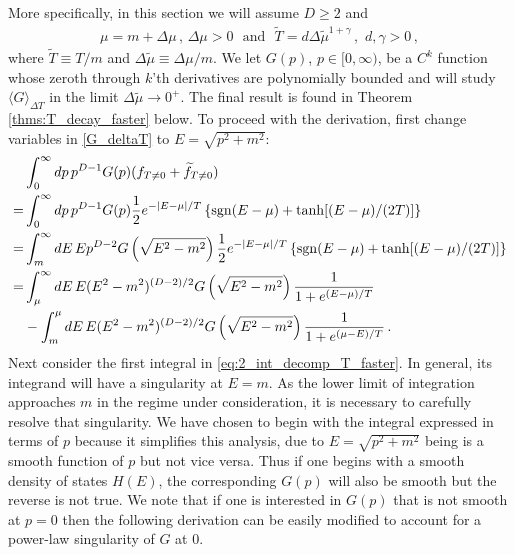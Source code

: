 \documentclass[sn-mathphys,Numbered]{sn-jnl}
\begin{document}
More specifically, in this section we will assume  $D\geq 2$ and
\begin{align}\label{eq:T_mu_relation}
    \mu=m+\Delta\mu\,, \,\Delta\mu>0 \,\, \text{ and } \,\, \widetilde{T}=d\Delta\widetilde{\mu}^{1+\gamma}\,, \,\,d,\gamma>0\,,
\end{align}
where $\widetilde{T}\equiv T/m$ and $\Delta\widetilde{\mu}\equiv \Delta\mu/m$. We let $G(p)$, $p\in[0,\infty)$, be a $C^k$ function whose zeroth through $k$'th derivatives are polynomially bounded and will  study $\langle G\rangle_{\Delta T}$ in the limit $\Delta\widetilde{\mu}\to 0^+$.  The final result is found in Theorem \ref{thms:T_decay_faster} below. To proceed with the derivation, first change variables in \eqref{G_deltaT} to $E=\sqrt{p^2+m^2}$:
\begin{align}
    &\int_0^\infty dp\, p^{D-1} G(p)(f_{T\neq 0}+\widetilde{f}_{T\neq 0})\notag\\
=&\int_0^\infty dp\, p^{D-1} G(p)\frac{1}{2}e^{-|E-\mu|/T}\left\{\mathrm{sgn}(E-\mu)+\tanh[(E-\mu)/(2T)]\right\}\notag\\
    =&\int_m^\infty dE \,Ep^{D-2} G\left(\sqrt{E^2-m^2}\right)\frac{1}{2}e^{-|E-\mu|/T}\left\{\mathrm{sgn}(E-\mu)+\tanh[(E-\mu)/(2T)]\right\}\notag\\
    =&\int_{\mu}^\infty dE\, E(E^2-m^2)^{(D-2)/2} G\left(\sqrt{E^2-m^2}\right)
    \frac{1}{1+e^{(E-\mu)/T}}\label{eq:2_int_decomp_T_faster}  \\
    &-\int_m^{\mu} dE \,E(E^2-m^2)^{(D-2)/2} G\left(\sqrt{E^2-m^2}\right)\frac{1}{1+e^{(\mu-E)/T}} \,.\notag
\end{align}
Next consider the first integral in \eqref{eq:2_int_decomp_T_faster}. In general, its integrand will have a singularity at $E=m$. As the lower limit of integration approaches $m$ in the regime under consideration, it is necessary to carefully resolve that singularity. We have chosen to begin with the integral expressed in terms of $p$ because it simplifies this analysis, due to $E=\sqrt{p^2+m^2}$ being is a smooth function of $p$ but not vice versa. Thus if one begins with a smooth density of states $H(E)$, the corresponding $G(p)$ will also be smooth but the reverse is not true. We note that if one is interested in $G(p)$ that is not smooth at $p=0$ then the following derivation can be easily modified to account for a power-law singularity of $G$ at $0$.
\end{document}
